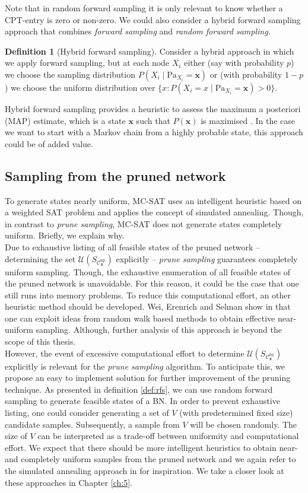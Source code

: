 \documentclass[a4paper, twoside, 11pt]{report}
\newcommand{\bfx}{{\mathbf{x}}}
\newcommand{\C}{{\mathcal C}}
\newcommand{\U}{{\mathcal{U}}}
\theoremstyle{plain}
\theoremstyle{definition}
\newtheorem{definition}[thm]{Definition}
\theoremstyle{remark}
\newcommand{\ps}{\textit{prune sampling }}
\begin{document}
Note that in random forward sampling it is only relevant to know whether a CPT-entry is zero or non-zero. We could also consider a hybrid forward sampling approach that combines \textit{forward sampling} and \textit{random forward sampling}.
\begin{definition}[Hybrid forward sampling]
Consider a hybrid approach in which we apply forward sampling, but at each node $X_i$ either (say with probability $p$) we choose the sampling distribution $P(X_i \mid \text{Pa}_{X_i} = \mathbf{x})$ or (with probability $1-p$) we choose the uniform distribution over $\{x : P(X_i = x \mid \text{Pa}_{X_i}=\mathbf{x}) > 0\}$. 
\end{definition}
Hybrid forward sampling provides a heuristic to assess the maximum a posteriori (MAP) estimate, which is a state $\bfx$ such that $P(\bfx)$ is maximised \cite{park2002using}. In the case we want to start with a Markov chain from a highly probable state, this approach could be of added value. 


\subsection{Sampling from the pruned network}
To generate states nearly uniform, MC-SAT uses an intelligent heuristic \cite{wei2004towards} based on a weighted SAT problem and applies the concept of simulated annealing. Though, in contrast to \textit{prune sampling}, MC-SAT does not generate states completely uniform. Briefly, we explain why.\\

Due to exhaustive listing of all feasible states of the pruned network -- determining the set $\U(S_{\C_\bfx^{\text{np}}})$ explicitly -- \ps guarantees completely uniform sampling. Though, the exhaustive enumeration of all feasible states of the pruned network is unavoidable. For this reason, it could be the case that one still runs into memory problems. To reduce this computational effort, an other heuristic method should be developed. Wei, Erenrich and Selman show in \cite{wei2004towards} that one can exploit ideas from random walk based methods to obtain effective near-uniform sampling. Although, further analysis of this approach is beyond the scope of this thesis. \\

However, the event of excessive computational effort to determine $\U(S_{\C_\bfx^{\text{np}}})$ explicitly is relevant for the \ps algorithm. To anticipate this, we propose an easy to implement solution for further improvement of the pruning technique. As presented in definition \ref{def:rfs}, we can use random forward sampling to generate feasible states of a BN. In order to prevent exhaustive listing, one could consider generating a set of $V$ (with predetermined fixed size) candidate samples. Subsequently, a sample from $V$ will be chosen randomly. The size of $V$ can be interpreted as a trade-off between uniformity and computational effort. We expect that there should be more intelligent heuristics to obtain near- and completely uniform samples from the pruned network and we again refer to the simulated annealing approach in \cite{wei2004towards} for inspiration. We take a closer look at these approaches in Chapter \ref{ch:5}.
\end{document}
